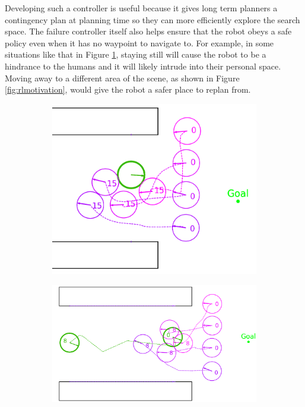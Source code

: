 \documentclass[letterpaper, 10 pt, conference]{ieeeconf}  %
\begin{document}
	Developing such a controller is useful because it gives long term planners a contingency plan at planning time so they can more efficiently explore the search space. The failure controller itself also helps ensure that the robot obeys a safe policy even when it has no waypoint to navigate to. For example, in some situations like that in Figure \ref{fig:dnmotivation}, staying still will cause the robot to be a hindrance to the humans and it will likely intrude into their personal space. Moving away to a different area of the scene, as shown in Figure \ref{fig:rlmotivation}, would give the robot a safer place to replan from.
	
	\begin{figure}
		\centering
		\begin{subfigure}[t]{0.49\linewidth}
			\includegraphics[width=\linewidth]{dnmotive}
			\caption{}
			\label{fig:dnmotivation}
		\end{subfigure}
		\begin{subfigure}[t]{0.49\linewidth}
			\includegraphics[width=\linewidth]{rlmotive}

\end{subfigure}
\end{figure}
\end{document}
